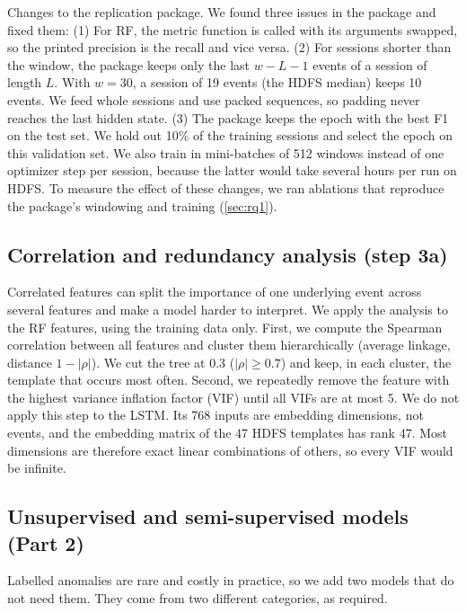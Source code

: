 \documentclass[10pt, conference]{IEEEtran}
\renewcommand{\paragraph}[1]{\noindent\textsf{#1}.}
\begin{document}
\paragraph{Changes to the replication package} We found three issues in the package and fixed them:
(1) For RF, the metric function is called with its arguments swapped, so the printed precision is the recall and vice versa.
(2) For sessions shorter than the window, the package keeps only the last $w-L-1$ events of a session of length $L$. With $w=30$, a session of 19 events (the HDFS median) keeps 10 events. We feed whole sessions and use packed sequences, so padding never reaches the last hidden state.
(3) The package keeps the epoch with the best F1 on the test set. We hold out 10\% of the training sessions and select the epoch on this validation set.
We also train in mini-batches of 512 windows instead of one optimizer step per session, because the latter would take several hours per run on HDFS. To measure the effect of these changes, we ran ablations that reproduce the package's windowing and training (\cref{sec:rq1}).

\subsection{Correlation and redundancy analysis (step 3a)}

Correlated features can split the importance of one underlying event across several features and make a model harder to interpret. We apply the analysis to the RF features, using the training data only. First, we compute the Spearman correlation between all features and cluster them hierarchically (average linkage, distance $1-|\rho|$). We cut the tree at 0.3 ($|\rho| \geq 0.7$) and keep, in each cluster, the template that occurs most often. Second, we repeatedly remove the feature with the highest variance inflation factor (VIF) until all VIFs are at most 5. We do not apply this step to the LSTM. Its 768 inputs are embedding dimensions, not events, and the embedding matrix of the 47 HDFS templates has rank 47. Most dimensions are therefore exact linear combinations of others, so every VIF would be infinite.

\subsection{Unsupervised and semi-supervised models (Part 2)}

Labelled anomalies are rare and costly in practice, so we add two models that do not need them. They come from two different categories, as required.
\end{document}

